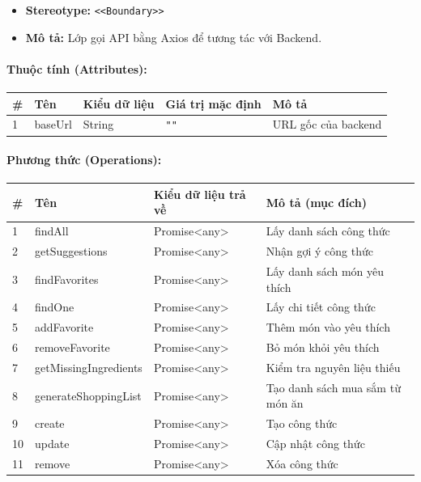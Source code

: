 \documentclass[12pt,a4paper]{article}
\begin{document}
\begin{itemize}[leftmargin=*]
    \item \textbf{Stereotype:} \texttt{\textless{}\textless{}Boundary\textgreater{}\textgreater{}}
    \item \textbf{Mô tả:} Lớp gọi API bằng Axios để tương tác với Backend.
\end{itemize}

\paragraph{Thuộc tính (Attributes):}
\begin{longtable}{|p{0.6cm}|p{3.5cm}|p{2.4cm}|p{1.8cm}|p{5.1cm}|}
\hline
\textbf{\#} & \textbf{Tên} & \textbf{Kiểu dữ liệu} & \textbf{Giá trị mặc định} & \textbf{Mô tả} \\ \hline
\endhead
1 & baseUrl & String & \texttt{""} & URL gốc của backend \\ \hline
\end{longtable}

\paragraph{Phương thức (Operations):}
\begin{longtable}{|p{0.6cm}|p{5.0cm}|p{2.8cm}|p{5.4cm}|}
\hline
\textbf{\#} & \textbf{Tên} & \textbf{Kiểu dữ liệu trả về} & \textbf{Mô tả (mục đích)} \\ \hline
\endhead
1 & findAll & Promise\textless{}any\textgreater{} & Lấy danh sách công thức \\ \hline
2 & getSuggestions & Promise\textless{}any\textgreater{} & Nhận gợi ý công thức \\ \hline
3 & findFavorites & Promise\textless{}any\textgreater{} & Lấy danh sách món yêu thích \\ \hline
4 & findOne & Promise\textless{}any\textgreater{} & Lấy chi tiết công thức \\ \hline
5 & addFavorite & Promise\textless{}any\textgreater{} & Thêm món vào yêu thích \\ \hline
6 & removeFavorite & Promise\textless{}any\textgreater{} & Bỏ món khỏi yêu thích \\ \hline
7 & getMissingIngredients & Promise\textless{}any\textgreater{} & Kiểm tra nguyên liệu thiếu \\ \hline
8 & generateShoppingList & Promise\textless{}any\textgreater{} & Tạo danh sách mua sắm từ món ăn \\ \hline
9 & create & Promise\textless{}any\textgreater{} & Tạo công thức \\ \hline
10 & update & Promise\textless{}any\textgreater{} & Cập nhật công thức \\ \hline
11 & remove & Promise\textless{}any\textgreater{} & Xóa công thức \\ \hline
\end{longtable}
\end{document}
